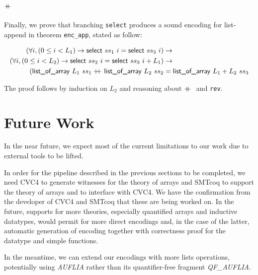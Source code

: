 \documentclass[onecolumn, preprint]{sigplanconf}
\newcommand{\select}[2]{\textsf{select } #1\ #2}
\newcommand{\loa}[2]{\textsf{list\_of\_array } #1\ #2}
\newcommand{\codeinl}[1]{\texttt{#1}}
\newcommand\doubleplus{+\kern-1.3ex+\kern0.8ex}
\begin{document}
\subsection{$\doubleplus$}
Finally, we prove that branching \codeinl{select} produces a sound encoding for list-append in theorem \texttt{enc\_app}, stated as follow:

\begin{align*}
(\forall i, (0 \leq i < L_1) \to \select{ss_1}{i} = \select{ss_3}{i}) &\to \\
  (\forall i, (0 \leq i < L_2) \to \select{ss_2}{i} = \select{ss_3}{i + L_1}) &\to  \\
  (\loa{L_1}{ss_1} \doubleplus \loa{L_2}{ss_2} &= \loa{L_1 + L_2}{ss_3}
\end{align*}

The proof follows by induction on $L_2$ and reasoning about $\doubleplus$ and \texttt{rev}.


\section{Future Work}
\label{sec:future}
In the near future, we expect most of the current limitations to our work due to external tools to be lifted.

In order for the pipeline described in the previous sections to be completed, we need CVC4 to generate witnesses for the theory of arrays and SMTcoq to support the theory of arrays and to interface with CVC4. We have the confirmation from the developer of CVC4 and SMTcoq that these are being worked on. In the future, supports for more theories, especially quantified arrays and inductive datatypes, would permit for more direct encodings and, in the case of the latter, automatic generation of encoding together with correctness proof for the datatype and simple functions.


In the meantime, we can extend our encodings with more lists operations, potentially using \emph{AUFLIA} rather than its quantifier-free fragment \emph{QF\_AUFLIA}.
\end{document}
